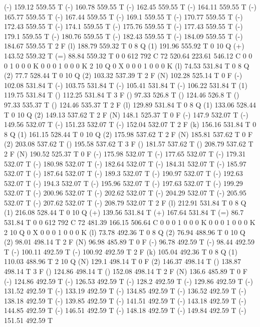 (-) 159.12 559.55 T
(-) 160.78 559.55 T
(-) 162.45 559.55 T
(-) 164.11 559.55 T
(-) 165.77 559.55 T
(-) 167.44 559.55 T
(-) 169.1 559.55 T
(-) 170.77 559.55 T
(-) 172.43 559.55 T
(-) 174.1 559.55 T
(-) 175.76 559.55 T
(-) 177.43 559.55 T
(-) 179.1 559.55 T
(-) 180.76 559.55 T
(-) 182.43 559.55 T
(-) 184.09 559.55 T
(-) 184.67 559.55 T
2 F
(l) 188.79 559.32 T
0 8 Q
(1) 191.96 555.92 T
0 10 Q
(+) 143.52 559.32 T
(=) 88.84 559.32 T
0 0 612 792 C
72 520.64 223.61 546.12 C
0 0 0 1 0 0 0 K
0 0 0 1 0 0 0 K
2 10 Q
0 X
0 0 0 1 0 0 0 K
(l) 74.53 531.84 T
0 8 Q
(2) 77.7 528.44 T
0 10 Q
(2) 103.32 537.39 T
2 F
(N) 102.28 525.14 T
0 F
(-) 102.08 531.84 T
(-) 103.75 531.84 T
(-) 105.41 531.84 T
(-) 106.22 531.84 T
(1) 119.75 531.84 T
() 112.25 531.84 T
3 F
() 97.33 526.8 T
() 124.46 526.8 T
() 97.33 535.37 T
() 124.46 535.37 T
2 F
(l) 129.89 531.84 T
0 8 Q
(1) 133.06 528.44 T
0 10 Q
(2) 149.13 537.62 T
2 F
(N) 148.1 525.37 T
0 F
(-) 147.9 532.07 T
(-) 149.56 532.07 T
(-) 151.23 532.07 T
(-) 152.04 532.07 T
2 F
(k) 156.16 531.84 T
0 8 Q
(1) 161.15 528.44 T
0 10 Q
(2) 175.98 537.62 T
2 F
(N) 185.81 537.62 T
0 F
(2) 203.08 537.62 T
() 195.58 537.62 T
3 F
() 181.57 537.62 T
() 208.79 537.62 T
2 F
(N) 190.52 525.37 T
0 F
(-) 175.98 532.07 T
(-) 177.65 532.07 T
(-) 179.31 532.07 T
(-) 180.98 532.07 T
(-) 182.64 532.07 T
(-) 184.31 532.07 T
(-) 185.97 532.07 T
(-) 187.64 532.07 T
(-) 189.3 532.07 T
(-) 190.97 532.07 T
(-) 192.63 532.07 T
(-) 194.3 532.07 T
(-) 195.96 532.07 T
(-) 197.63 532.07 T
(-) 199.29 532.07 T
(-) 200.96 532.07 T
(-) 202.62 532.07 T
(-) 204.29 532.07 T
(-) 205.95 532.07 T
(-) 207.62 532.07 T
(-) 208.79 532.07 T
2 F
(l) 212.91 531.84 T
0 8 Q
(1) 216.08 528.44 T
0 10 Q
(+) 139.56 531.84 T
(+) 167.64 531.84 T
(=) 86.7 531.84 T
0 0 612 792 C
72 481.39 166.15 506.64 C
0 0 0 1 0 0 0 K
0 0 0 1 0 0 0 K
2 10 Q
0 X
0 0 0 1 0 0 0 K
(l) 73.78 492.36 T
0 8 Q
(2) 76.94 488.96 T
0 10 Q
(2) 98.01 498.14 T
2 F
(N) 96.98 485.89 T
0 F
(-) 96.78 492.59 T
(-) 98.44 492.59 T
(-) 100.11 492.59 T
(-) 100.92 492.59 T
2 F
(k) 105.04 492.36 T
0 8 Q
(1) 110.03 488.96 T
2 10 Q
(N) 129.1 498.14 T
0 F
(2) 146.37 498.14 T
() 138.87 498.14 T
3 F
() 124.86 498.14 T
() 152.08 498.14 T
2 F
(N) 136.6 485.89 T
0 F
(-) 124.86 492.59 T
(-) 126.53 492.59 T
(-) 128.2 492.59 T
(-) 129.86 492.59 T
(-) 131.52 492.59 T
(-) 133.19 492.59 T
(-) 134.85 492.59 T
(-) 136.52 492.59 T
(-) 138.18 492.59 T
(-) 139.85 492.59 T
(-) 141.51 492.59 T
(-) 143.18 492.59 T
(-) 144.85 492.59 T
(-) 146.51 492.59 T
(-) 148.18 492.59 T
(-) 149.84 492.59 T
(-) 151.51 492.59 T
